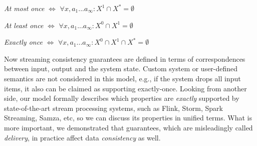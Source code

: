 \documentclass[sigconf]{acmart}
\theoremstyle{remark}
\begin{document}
{\em At most once} $\iff$ $\forall{x,a_1...a_\infty}:X^{1}\cap{X^{*}}=\emptyset$

{\em At least once} $\iff$ $\forall{x,a_1...a_\infty}:X^{0}\cap{X^{1}}=\emptyset$

{\em Exactly once} $\iff$ $\forall{x,a_1...a_\infty}:X^{0}\cap{X^{1}}\cap{X^{*}}=\emptyset$

Now streaming consistency guarantees are defined in terms of correspondences between input, output and the system state. Custom system or user-defined semantics are not considered in this model, e.g., if the system drops all input items, it also can be claimed as supporting exactly-once. Looking from another side, our model formally describes which properties are {\em exactly} supported by state-of-the-art stream processing systems, such as Flink, Storm, Spark Streaming, Samza, etc, so we can discuss its properties in unified terms. What is more important, we demonstrated that guarantees, which are misleadingly called {\em delivery}, in practice affect data {\em consistency} as well.










\end{document}
